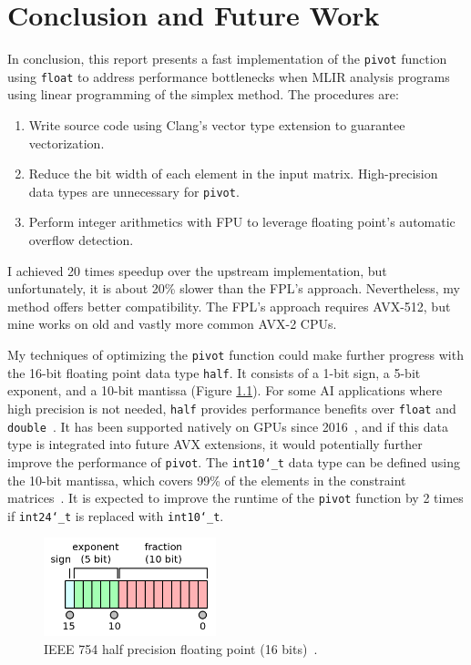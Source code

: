 \documentclass[logo,bsc,singlespacing,parskip]{infthesis}
\newcommand{\dthalfi}{\texttt{int10\char`_t}}
\newcommand{\dthalf}{\texttt{half}}
\newcommand{\dtfloat}{\texttt{float}}
\newcommand{\dtfloati}{\texttt{int24\char`_t}}
\newcommand{\dtdouble}{\texttt{double}}
\newcommand{\pivot}{\texttt{pivot}}
\begin{document}
\chapter{Conclusion and Future Work}

In conclusion, this report presents a fast implementation of the \pivot{}
function using \dtfloat{} to address performance bottlenecks when MLIR analysis
programs using linear programming of the simplex method. The procedures are: 
\begin{enumerate}
    \item Write source code using Clang's vector type extension to guarantee
    vectorization.
    \item Reduce the bit width of each element in the input matrix.
    High-precision data types are unnecessary for \pivot{}.
    \item Perform integer arithmetics with FPU to leverage floating point's
    automatic overflow detection.
\end{enumerate}

I achieved 20 times speedup over the upstream implementation, but unfortunately,
it is about 20\% slower than the FPL's approach. Nevertheless, my method offers
better compatibility. The FPL's approach requires AVX-512, but mine works on old
and vastly more common AVX-2 CPUs.


My techniques of optimizing the \texttt{pivot} function could make further
progress with the 16-bit floating point data type \dthalf{}. It consists of
a 1-bit sign, a 5-bit exponent, and a 10-bit mantissa (Figure
\ref{fig:ieee-f16}). For some AI applications where high precision is not
needed, \dthalf{} provides performance benefits over \dtfloat{} and
\dtdouble{}~\cite{fp16-fast}. It has been supported natively on GPUs since
2016~\cite{pascal-intro-fp16}, and if this data type is integrated into future
AVX extensions, it would potentially further improve the performance of
\pivot{}. The \dthalfi{} data type can be defined using the 10-bit
mantissa, which covers 99\% of the elements in the constraint
matrices~\cite{FPL1}. It is expected to improve the runtime of the \pivot{}
function by 2 times if \dtfloati{} is replaced with \dthalfi{}.


\begin{figure}[H]
    \begin{center}
    \includegraphics[width=50mm,scale=0.1]{image/ieee-f16.png}
    \end{center}
    \caption{IEEE 754 half precision floating point (16 bits)~\cite{fp16-diagram}.}
    \label{fig:ieee-f16}
\end{figure}
\end{document}
